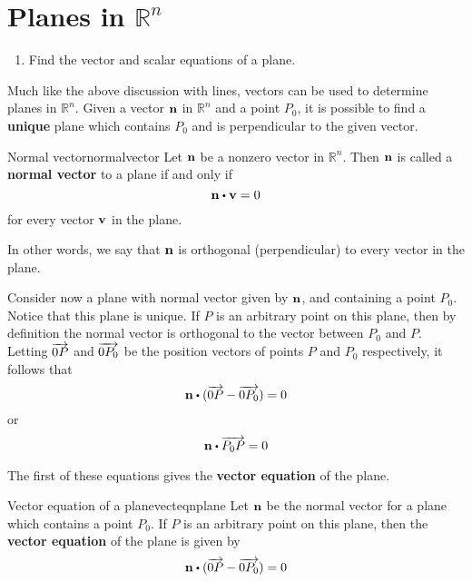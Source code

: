 \pagebreak
\section{Planes in $\mathbb{R}^n$}

\begin{outcome}

\begin{enumerate}

\item[A.] Find the vector and scalar equations of a plane.

\end{enumerate}
\end{outcome}

Much like the above discussion with lines, vectors can be used to determine planes in $\mathbb{R}^n$. Given a vector ${\bf n}$ in $\mathbb{R}^n$ and a point $P_0$, it is possible to find a \textbf{unique} plane which contains $P_0$ and is perpendicular to the given vector. 

\begin{definition}{Normal vector}{normalvector}
Let ${\bf n}$ be a nonzero vector in $\mathbb{R}^n$. Then ${\bf n}$ is called a \textbf{normal vector} to a plane if and only if 
\[
\vect{n} \dotprod \vect{v} = 0
\]
for every vector ${\bf v}$ in the plane. 
\end{definition}

In other words, we say that ${\bf n}$ is orthogonal (perpendicular) to every vector in the plane. 

Consider now a plane with normal vector given by ${\bf n}$, and containing a point $P_0$. Notice that this plane is unique. If $P$ is an arbitrary point on this plane, then by definition the normal vector is orthogonal to the vector between $P_0$ and $P$. Letting $\overrightarrow{0P}$ and $\overrightarrow{0P_0}$ be the position vectors of points $P$ and $P_0$ respectively, it follows that 
\[
\vect{n} \dotprod (\longvect{0P} - \longvect{0P_0}) = 0 
\]
or
\[
\vect{n} \dotprod \longvect{P_0P} = 0 
\]

The first of these equations gives the \textbf{vector equation} of the plane. 

\begin{definition}{Vector equation of a plane}{vecteqnplane}
Let ${\bf n}$ be the normal vector for a plane which contains a point $P_0$. If $P$ is an arbitrary point on this plane, then the \textbf{vector equation} of the plane is given by 
\[
\vect{n} \dotprod (\longvect{0P} - \longvect{0P_0}) = 0
\]
\end{definition}

